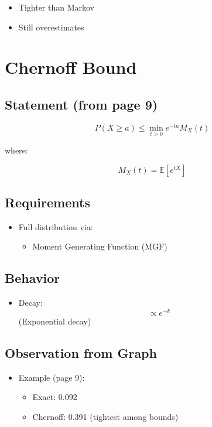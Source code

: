 \documentclass[11pt]{article}
\begin{document}
\begin{itemize}
\item Tighter than Markov
\item Still overestimates
\end{itemize}

\section{Chernoff Bound}

\subsection{Statement (from page 9)}

\[
P(X \ge a) \le \min_{t>0} e^{-ta} M_X(t)
\]

where:

\[
M_X(t) = \mathbb{E}[e^{tX}]
\]

\subsection{Requirements}

\begin{itemize}
\item Full distribution via:
\begin{itemize}
\item Moment Generating Function (MGF)
\end{itemize}
\end{itemize}

\subsection{Behavior}

\begin{itemize}
\item Decay:
\[
\propto e^{-k}
\]
(Exponential decay)
\end{itemize}

\subsection{Observation from Graph}

\begin{itemize}
\item Example (page 9):
\begin{itemize}
\item Exact: 0.092
\item Chernoff: 0.391 (tightest among bounds)
\end{itemize}
\end{itemize}
\end{document}
